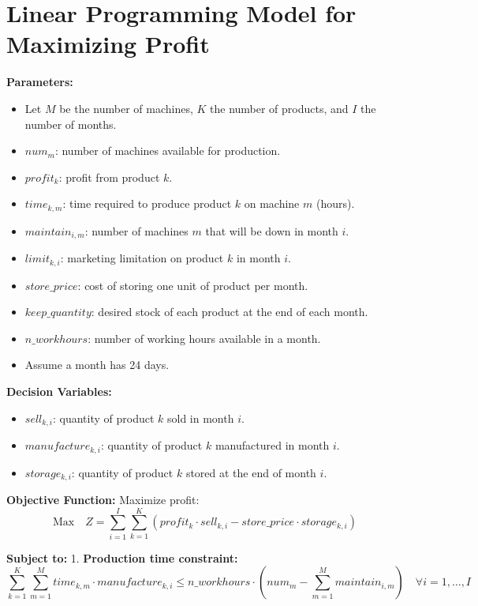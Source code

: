 \documentclass{article}
\begin{document}
\section*{Linear Programming Model for Maximizing Profit}

\textbf{Parameters:}
\begin{itemize}
    \item Let \( M \) be the number of machines, \( K \) the number of products, and \( I \) the number of months.
    \item \( num_{m} \): number of machines available for production.
    \item \( profit_{k} \): profit from product \( k \).
    \item \( time_{k, m} \): time required to produce product \( k \) on machine \( m \) (hours).
    \item \( maintain_{i, m} \): number of machines \( m \) that will be down in month \( i \).
    \item \( limit_{k, i} \): marketing limitation on product \( k \) in month \( i \).
    \item \( store\_price \): cost of storing one unit of product per month.
    \item \( keep\_quantity \): desired stock of each product at the end of each month.
    \item \( n\_workhours \): number of working hours available in a month.
    \item Assume a month has 24 days.
\end{itemize}

\textbf{Decision Variables:}
\begin{itemize}
    \item \( sell_{k, i} \): quantity of product \( k \) sold in month \( i \).
    \item \( manufacture_{k, i} \): quantity of product \( k \) manufactured in month \( i \).
    \item \( storage_{k, i} \): quantity of product \( k \) stored at the end of month \( i \).
\end{itemize}

\textbf{Objective Function:}
Maximize profit:
\[
\text{Max} \quad Z = \sum_{i=1}^{I} \sum_{k=1}^{K} (profit_{k} \cdot sell_{k, i} - store\_price \cdot storage_{k, i})
\]

\textbf{Subject to:}
1. \textbf{Production time constraint:}
\[
\sum_{k=1}^{K} \sum_{m=1}^{M} time_{k, m} \cdot manufacture_{k, i} \leq n\_workhours \cdot (num_{m} - \sum_{m=1}^{M} maintain_{i, m}) \quad \forall i=1,\ldots,I
\]
\end{document}
